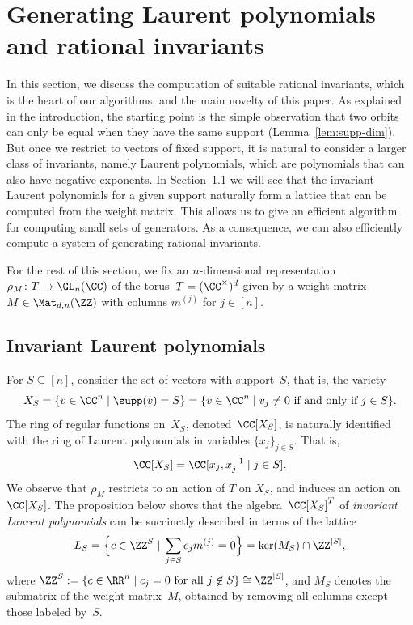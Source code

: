 \section{Generating Laurent polynomials and rational invariants}\label{sec:gen-inv}
%
In this section, we discuss the computation of suitable rational invariants, which is the heart of our algorithms, and the main novelty of this paper.
As explained in the introduction, the starting point is the simple observation that two orbits can only be equal when they have the same support (Lemma~\ref{lem:supp-dim}).
But once we restrict to vectors of fixed support, it is natural to consider a larger class of invariants, namely Laurent polynomials, which are polynomials that can also have negative exponents.
In Section~\ref{se:lattice} we will see that the invariant Laurent polynomials for a given support naturally form a lattice that can be computed from the weight matrix.
This allows us to give an efficient algorithm for computing small sets of generators.
As a consequence, we can also efficiently compute a system of generating rational invariants.

For the rest of this section, we fix an $n$-dimensional representation $\rho_M \colon T \rightarrow \GL_n(\CC)$ of the torus~$T=(\CC^\times)^d$ given by a weight matrix $M \in \Mat_{d,n}(\ZZ)$ with columns $m^{(j)}$ for $j\in[n]$.

%
\subsection{Invariant Laurent polynomials}\label{se:lattice}
%
For $S \subseteq [n]$, consider the set of vectors with support~$S$, that is, the variety
\begin{equation}\label{eq:XS}
  X_S = \{ v \in \CC^n \;|\; \supp(v) = S \} = \{ v \in \CC^n \;|\; v_j \neq 0 \text{ if and only if } j \in S \}.
\end{equation}
The ring of regular functions on~$X_S$, denoted~$\CC[X_S]$, is naturally identified with the ring of Laurent polynomials in variables $\{x_j\}_{j\in S}$.
That is,
\[
  \CC[X_S] = \CC[x_j, x_j^{-1} \;|\; j \in S].
\]
We observe that $\rho_M$ restricts to an action of $T$ on $X_S$, and induces an action on $\CC[X_S]$.
The proposition below shows that the
algebra~$\CC[X_S]^T$ of \emph{invariant Laurent polynomials} can be succinctly described in terms of the lattice
\begin{equation}\label{def:L}
  L_S = \Bigl\{ c \in \ZZ^S \;|\; \sum_{j \in S} c_j m^{(j)} = 0 \Bigr\} = \ker(M_S) \cap \ZZ^{|S|},
\end{equation}
where $\ZZ^S := \{ c \in \RR^n \;|\; c_j = 0 \text{ for all } j \not\in S \} \cong \ZZ^{|S|}$, and $M_S$ denotes the submatrix of the weight matrix~$M$,
obtained by removing all columns except those labeled by~$S$.
%

